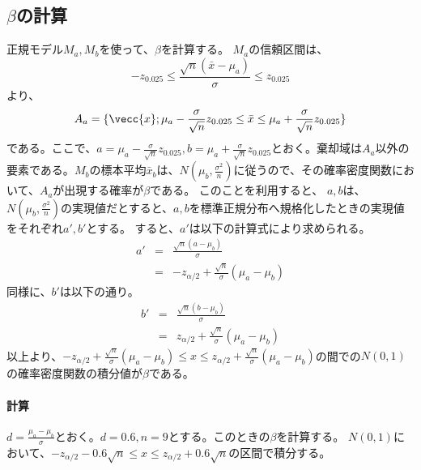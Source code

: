 \subsection{$\beta$の計算}
正規モデル$M_a,M_b$を使って、$\beta$を計算する。
$M_a$の信頼区間は、
\begin{equation*}
    -z_{0.025}\leq \frac{\sqrt{n}(\bar{x}-\mu_a)}{\sigma}\leq z_{0.025}
\end{equation*}
より、
\begin{equation*}
    A_a = \{ \vecc{x} ; \mu_a -\frac{\sigma}{\sqrt{n}}z_{0.025} \leq \bar{x} \leq \mu_a +\frac{\sigma}{\sqrt{n}}z_{0.025} \}
\end{equation*}
である。ここで、$a=\mu_a -\frac{\sigma}{\sqrt{n}}z_{0.025},b = \mu_a +\frac{\sigma}{\sqrt{n}}z_{0.025} $とおく。棄却域は$A_a$以外の要素である。$M_b$の標本平均$\bar{x}_b$は、$N(\mu_b,\frac{\sigma^2}{n})$に従うので、その確率密度関数において、$A_a$が出現する確率が$\beta$である。
このことを利用すると、
$a,b$は、$N(\mu_b,\frac{\sigma^2}{n})$の実現値だとすると、$a,b$を標準正規分布へ規格化したときの実現値をそれぞれ$a',b'$とする。
すると、$a'$は以下の計算式により求められる。
\begin{eqnarray*}
 a' &=& \frac{\sqrt{n}(a-\mu_b)}{\sigma} \\
    &=& -z_{\alpha/2}+\frac{\sqrt{n}}{\sigma}(\mu_a-\mu_b)
\end{eqnarray*}
同様に、$b'$は以下の通り。
\begin{eqnarray*}
 b' &=& \frac{\sqrt{n}(b-\mu_b)}{\sigma} \\
    &=& z_{\alpha/2}+\frac{\sqrt{n}}{\sigma}(\mu_a-\mu_b)
\end{eqnarray*}
以上より、$-z_{\alpha/2}+\frac{\sqrt{n}}{\sigma}(\mu_a-\mu_b) \leq x\leq  z_{\alpha/2}+\frac{\sqrt{n}}{\sigma}(\mu_a-\mu_b)$の間での$N(0,1)$の確率密度関数の積分値が$\beta$である。


\paragraph{計算}

$d=\frac{\mu_a-\mu_b}{\sigma}$とおく。$d=0.6,n=9$とする。このときの$\beta$を計算する。
$N(0,1)$において、$-z_{\alpha/2} -0.6\sqrt{n} \leq x \leq z_{\alpha/2} +0.6\sqrt{n}$の区間で積分する。


